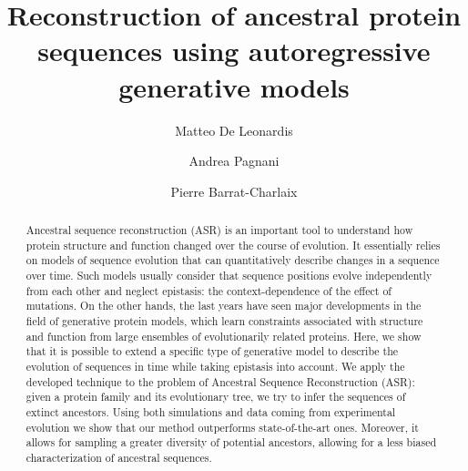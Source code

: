 \documentclass[a4paper,preprint]{revtex4-1}
\newcommand{\papertitle}{Reconstruction of ancestral protein sequences using autoregressive generative models}
\begin{document}
\title{\papertitle}


\author{Matteo De Leonardis}

\author{Andrea Pagnani}



\author{Pierre Barrat-Charlaix}


\begin{abstract}
Ancestral sequence reconstruction (ASR) is an important tool to understand how protein structure and function changed over the course of evolution. 
It essentially relies on models of sequence evolution that can quantitatively describe changes in a sequence over time. 
Such models usually consider that sequence positions evolve independently from each other and neglect epistasis: the context-dependence of the effect of mutations.
On the other hands, the last years have seen major developments in the field of generative protein models, which learn constraints associated with structure and function from large ensembles of evolutionarily related proteins. 
Here, we show that it is possible to extend a specific type of generative model to describe the evolution of sequences in time while taking epistasis into account. 
We apply the developed technique to the problem of Ancestral Sequence Reconstruction (ASR): given a protein family and its evolutionary tree, we try to infer the sequences of extinct ancestors. 
Using both simulations and data coming from experimental evolution we show that our method outperforms state-of-the-art ones. 
Moreover, it allows for sampling a greater diversity of potential ancestors, allowing for a less biased characterization of ancestral sequences. 
\end{abstract}

\maketitle



\newpage



\newpage
\newpage
\appendix
\setcounter{figure}{0}
\renewcommand{\figurename}{Figure S}
\setcounter{table}{0}
\renewcommand{\tablename}{Table S}
\onecolumngrid


\end{document}
